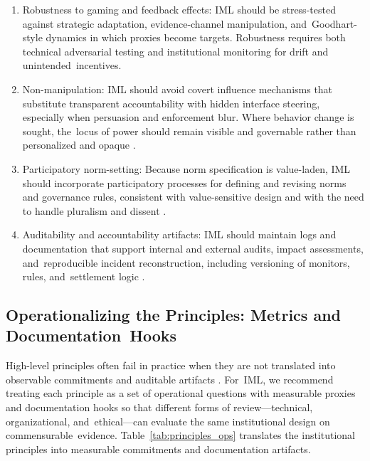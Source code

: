 \documentclass[mca,article,accept,pdftex,oneauthor]{Definitions/mdpi}
\begin{document}
\begin{enumerate}
    \item Robustness to gaming and feedback effects:
IML should be stress-tested against strategic adaptation, evidence-channel manipulation, and~Goodhart-style dynamics in which proxies become targets. Robustness requires both technical adversarial testing and institutional monitoring for drift and unintended~incentives.

    \item Non-manipulation:
IML should avoid covert influence mechanisms that substitute transparent accountability with hidden interface steering, especially when persuasion and enforcement blur. Where behavior change is sought, the~locus of power should remain visible and governable rather than personalized and opaque \citep{SusserRoesslerNissenbaum2019,Gray2018DarkPatterns}.

    \item Participatory norm-setting:
Because norm specification is value-laden, IML should incorporate participatory processes for defining and revising norms and governance rules, consistent with value-sensitive design and with the need to handle pluralism and dissent \citep{FriedmanKahnBorning2002}.

    \item Auditability and accountability artifacts:
IML should maintain logs and documentation that support internal and external audits, impact assessments, and~reproducible incident reconstruction, including versioning of monitors, rules, and~settlement logic \citep{Raji2020Auditing,Metcalf2021AIA,Selbst2021AIA}.
\end{enumerate}

\subsection{Operationalizing the Principles: Metrics and Documentation~Hooks}

High-level principles often fail in practice when they are not translated into observable commitments and auditable artifacts \citep{Mittelstadt2019Principles}. For~IML, we recommend treating each principle as a set of operational questions with measurable proxies and documentation hooks so that different forms of review---technical, organizational, and~ethical---can evaluate the same institutional design on commensurable~evidence. Table~\ref{tab:principles_ops} translates the institutional principles into measurable commitments and documentation artifacts.
\end{document}
